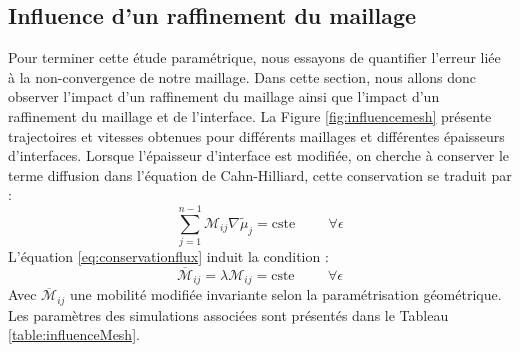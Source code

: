 \subsection{Influence d'un raffinement du maillage} \label{sec:raffinement}
Pour terminer cette étude paramétrique, nous essayons de quantifier l'erreur liée à la non-convergence de notre maillage. Dans cette section, nous allons donc observer l'impact d'un raffinement du maillage ainsi que l'impact d'un raffinement du maillage et de l'interface. La Figure \ref{fig:influencemesh} présente trajectoires et vitesses obtenues pour différents maillages et différentes épaisseurs d'interfaces.
Lorsque l'épaisseur d'interface est modifiée, on cherche à conserver le terme diffusion dans l'équation de Cahn-Hilliard, cette conservation se traduit par :
\begin{equation} \label{eq:conservationflux}
\sum_{j=1}^{n-1}{\mathcal{M}_{ij}} \nabla\tilde{\mu}_j = \text{cste} \hspace{1cm} \forall \epsilon
\end{equation}
L'équation \ref{eq:conservationflux} induit la condition :
\begin{equation}
	\overline{ \mathcal{M}}_{ij} = \lambda \mathcal{M}_{ij} = \text{cste} \hspace{1cm} \forall \epsilon
\end{equation}
Avec $\overline{ \mathcal{M}}_{ij}$ une mobilité modifiée invariante selon la paramétrisation géométrique. Les paramètres des simulations associées sont présentés dans le Tableau \ref{table:influenceMesh}.


